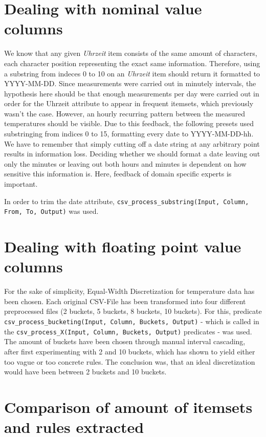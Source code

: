 \documentclass[bachelor,english]{info1thesis}
\begin{document}
\section{Dealing with nominal value columns}
\label{sec:nominalvalues}

We know that any given \textit{Uhrzeit} item consists of the same amount of characters, each character position representing the exact same information. Therefore, using a substring from indeces 0 to 10 on an \textit{Uhrzeit} item should return it formatted to YYYY-MM-DD. Since measurements were carried out in minutely intervals, the hypothesis here should be that enough measurements per day were carried out in order for the Uhrzeit attribute to appear in frequent itemsets, which previously wasn't the case. However, an hourly recurring pattern between the measured temperatures should be visible. Due to this feedback, the following presets used substringing from indices 0 to 15, formatting every date to YYYY-MM-DD-hh. 
We have to remember that simply cutting off a date string at any arbitrary point results in information loss. Deciding whether we should format a date leaving out only the minutes or leaving out both hours and minutes is dependent on how sensitive this information is. Here, feedback of domain specific experts is important.

In order to trim the date attribute, \texttt{csv\_process\_substring(Input, Column, From, To, Output)} was used.



\section{Dealing with floating point value columns}
\label{sec:floatingpointvalues}
For the sake of simplicity, Equal-Width Discretization for temperature data has been chosen. Each original CSV-File has been transformed into four different preprocessed files (2 buckets, 5 buckets, 8 buckets, 10 buckets). For this, predicate \texttt{csv\_process\_bucketing(Input, Column, Buckets, Output)} - which is called in the \texttt{csv\_process\_X(Input, Column, Buckets, Output)} predicates -  was used. The amount of buckets have been chosen through manual interval cascading, after first experimenting with 2 and 10 buckets, which has shown to yield either too vague or too concrete rules. The conclusion was, that an ideal discretization would have been between 2 buckets and 10 buckets.

\section{Comparison of amount of itemsets and rules extracted}
\label{sec:amountofrules}
\end{document}
